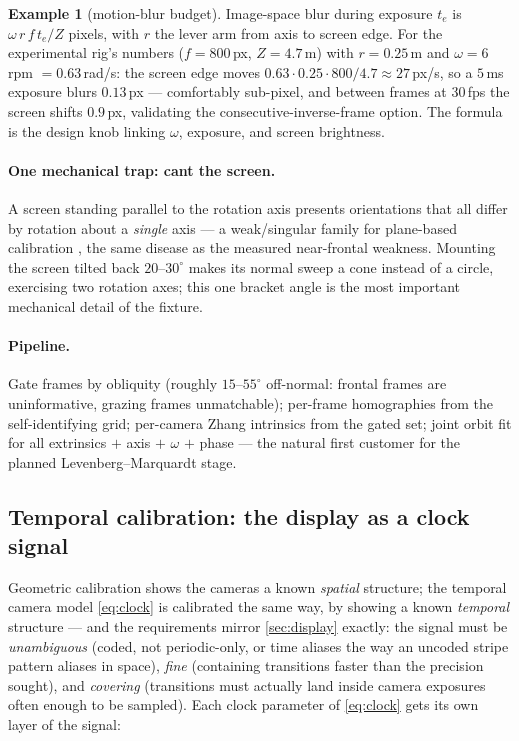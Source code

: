 \documentclass[11pt]{article}
\theoremstyle{definition}
\newtheorem{example}{Example}
\begin{document}
\begin{example}[motion-blur budget]
\label{ex:blur}
Image-space blur during exposure $t_e$ is
$\omega\,r\,f\,t_e/Z$ pixels, with $r$ the lever arm from axis to screen
edge. For the experimental rig's numbers ($f=800$\,px, $Z=4.7$\,m) with
$r=0.25$\,m and $\omega=6$\,rpm $=0.63$\,rad/s: the screen edge moves
$0.63\cdot0.25\cdot800/4.7\approx27$\,px/s, so a $5$\,ms exposure blurs
$0.13$\,px --- comfortably sub-pixel, and between frames at 30\,fps the
screen shifts $0.9$\,px, validating the consecutive-inverse-frame option.
The formula is the design knob linking $\omega$, exposure, and screen
brightness.
\end{example}

\paragraph{One mechanical trap: cant the screen.} A screen standing
parallel to the rotation axis presents orientations that all differ by
rotation about a \emph{single} axis --- a weak/singular family for
plane-based calibration \cite{SturmMaybank1999}, the same disease as the
measured near-frontal weakness. Mounting the screen tilted back
$20$--$30^\circ$ makes its normal sweep a cone instead of a circle,
exercising two rotation axes; this one bracket angle is the most important
mechanical detail of the fixture.

\paragraph{Pipeline.} Gate frames by obliquity (roughly $15$--$55^\circ$
off-normal: frontal frames are uninformative, grazing frames unmatchable);
per-frame homographies from the self-identifying grid; per-camera Zhang
intrinsics from the gated set; joint orbit fit for all extrinsics $+$
axis $+$ $\omega$ $+$ phase --- the natural first customer for the planned
Levenberg--Marquardt stage.

\subsection{Temporal calibration: the display as a clock signal}
\label{sec:tempcalib}

Geometric calibration shows the cameras a known \emph{spatial} structure;
the temporal camera model \eqref{eq:clock} is calibrated the same way,
by showing a known \emph{temporal} structure --- and the requirements
mirror \autoref{sec:display} exactly: the signal must be
\emph{unambiguous} (coded, not periodic-only, or time aliases the way an
uncoded stripe pattern aliases in space), \emph{fine} (containing
transitions faster than the precision sought), and \emph{covering}
(transitions must actually land inside camera exposures often enough to
be sampled). Each clock parameter of \eqref{eq:clock} gets its own layer
of the signal:
\end{document}
